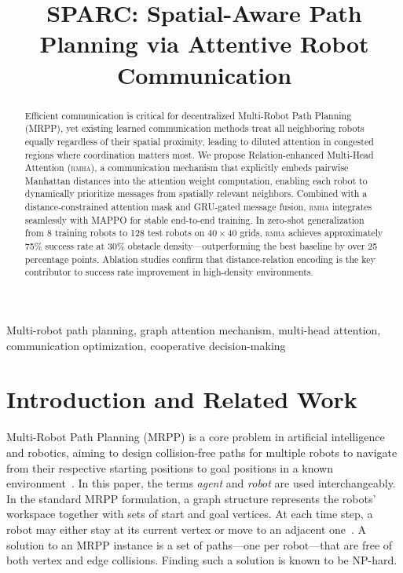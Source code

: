 \documentclass[conference]{IEEEtran}
\newcommand{\rmha}{\textsc{rmha}}
\begin{document}
\title{SPARC: Spatial-Aware Path Planning via Attentive Robot Communication}

\author{
}

\maketitle

\begin{abstract}
Efficient communication is critical for decentralized Multi-Robot
Path Planning (MRPP), yet existing learned communication methods
treat all neighboring robots equally regardless of their spatial
proximity, leading to diluted attention in congested regions where
coordination matters most.
We propose Relation-enhanced Multi-Head Attention (\rmha), a
communication mechanism that explicitly embeds pairwise Manhattan
distances into the attention weight computation, enabling each
robot to dynamically prioritize messages from spatially relevant
neighbors.
Combined with a distance-constrained attention mask and GRU-gated
message fusion, \rmha{} integrates seamlessly with MAPPO for
stable end-to-end training.
In zero-shot generalization from 8 training robots to 128 test
robots on $40\!\times\!40$ grids, \rmha{} achieves approximately
75\% success rate at 30\% obstacle density---outperforming the
best baseline by over 25 percentage points.
Ablation studies confirm that distance-relation encoding is the
key contributor to success rate improvement in high-density
environments.
\end{abstract}

\begin{IEEEkeywords}
Multi-robot path planning, graph attention mechanism, multi-head
attention, communication optimization, cooperative decision-making
\end{IEEEkeywords}

\section{Introduction and Related Work}

Multi-Robot Path Planning (MRPP) is a core problem in artificial
intelligence and robotics, aiming to design collision-free paths
for multiple robots to navigate from their respective starting
positions to goal positions in a known environment~\cite{wang2023scrimp}.
In this paper, the terms \emph{agent} and \emph{robot} are used
interchangeably.
In the standard MRPP formulation, a graph structure represents the
robots' workspace together with sets of start and goal
vertices.
At each time step, a robot may either stay at its current vertex
or move to an adjacent one~\cite{li2021lifelong}.
A solution to an MRPP instance is a set of paths—one per robot—that
are free of both vertex and edge collisions.
Finding such a solution is known to be NP-hard.
\end{document}
